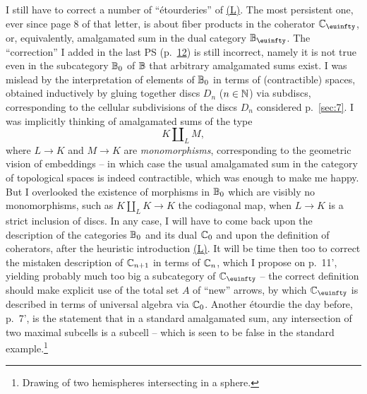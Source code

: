 \bigbreak

\noindent\hfill{}\par

\label{sec:18}%
I still have to correct a number of ``\'etourderies'' of
\hyperref[ch:I]{(L)}. The most persistent one, ever since page 8 of
that letter, is about fiber products in the coherator $\bC_\oo$, or,
equivalently, amalgamated sum in the dual category $\bB_\oo$. The
``correction'' I added in the last PS (p.\ \hyperref[p:L.12]{12}) is
still incorrect, namely it is not true even in the subcategory ${\mathbb{B}}_0$
of ${\mathbb{B}}$ that arbitrary amalgamated sums exist. I was mislead by the
interpretation of elements of ${\mathbb{B}}_0$ in terms of (contractible)
spaces, obtained inductively by gluing together discs $D_n$
($n\in{\ensuremath{\mathbb{N}}}$) via subdiscs, corresponding to the cellular subdivisions
of the discs $D_n$ considered p.\ \ref{sec:7}. I was implicitly
thinking of amalgamated sums of the type
\[ K \amalg_L M,\]
where $L\to K$ and $M\to K$ are \emph{monomorphisms}, corresponding to
the geometric vision of embeddings -- in which case the usual
amalgamated sum in the category of topological spaces is indeed
contractible, which was enough to make me happy. But I overlooked the
existence of morphisms in ${\mathbb{B}}_0$ which are visibly no
monomorphisms, such as $K \amalg_L K \to K$ the codiagonal map, when
$L \to K$ is a strict inclusion of discs. In any case, I will have to
come back upon the description of the categories ${\mathbb{B}}_0$ and its
dual ${\mathbb{C}}_0$ and upon the definition of coherators, after the
heuristic introduction \hyperref[ch:I]{(L)}. It will be time then too to correct the
mistaken description of ${\mathbb{C}}_{n+1}$ in terms of ${\mathbb{C}}_n$, which I
propose on p.\ 11', yielding probably much too big a subcategory of
$\bC_\oo$ -- the correct definition should make explicit use of the
total set $A$ of ``new'' arrows, by which $\bC_\oo$ is described in
terms of universal algebra via ${\mathbb{C}}_0$. Another \'etourdie the day
before, p.\ 7', is the statement that in a standard amalgamated sum,
any intersection of two maximal subcells is a subcell -- which is seen
to be false in the standard example.\footnote{Drawing of two
  hemispheres intersecting in a sphere.}

